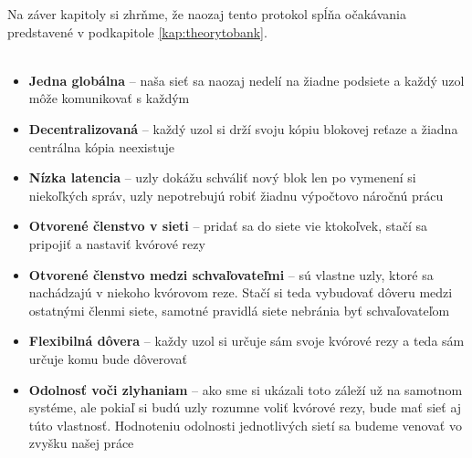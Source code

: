 \vspace{10mm}
Na záver kapitoly si zhrňme, že naozaj tento protokol spĺňa očakávania predstavené
v podkapitole \ref{kap:theorytobank}.
\\
\\

\begin{itemize}
\item  \textbf{Jedna globálna} -- naša sieť sa naozaj nedelí na žiadne podsiete
a každý uzol môže komunikovať s každým
\item  \textbf{Decentralizovaná} -- každý uzol si drží svoju kópiu blokovej reťaze
a žiadna centrálna kópia neexistuje
\item  \textbf{Nízka latencia} -- uzly dokážu schváliť nový blok len po vymenení si
niekoľkých správ, uzly nepotrebujú robiť žiadnu výpočtovo náročnú prácu
\item  \textbf{Otvorené členstvo v sieti} -- pridať sa do siete vie ktokoľvek, stačí
sa pripojiť a nastaviť kvórové rezy
\item  \textbf{Otvorené členstvo medzi schvaľovateľmi} --  sú
vlastne uzly, ktoré sa nachádzajú v niekoho kvórovom reze. Stačí si teda vybudovať
dôveru medzi ostatnými členmi siete, samotné pravidlá siete nebránia byť schvaľovateľom
\item  \textbf{Flexibilná dôvera} -- každy uzol si určuje sám svoje kvórové rezy a teda
sám určuje komu bude dôverovať
\item  \textbf{Odolnosť voči zlyhaniam} -- ako sme si ukázali toto záleží už na samotnom
systéme, ale pokiaľ si budú uzly rozumne voliť kvórové rezy, bude mať sieť aj túto vlastnosť.
Hodnoteniu odolnosti jednotlivých sietí sa budeme venovať vo zvyšku našej práce
\end{itemize}